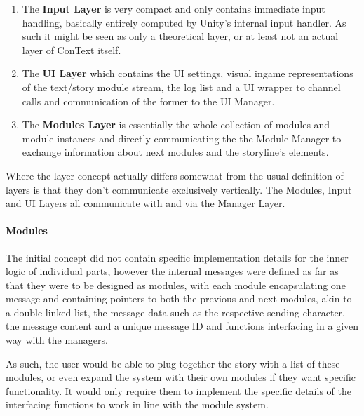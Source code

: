 \begin{enumerate}
\item The \textbf{Input Layer} is very compact and only contains immediate input handling,  basically entirely computed by Unity's internal input handler. As such it might be seen as only a theoretical layer, or at least not an actual layer of ConText itself.
\item The \textbf{UI Layer} which contains the UI settings, visual ingame representations of the text/story module stream, the log list and a UI wrapper to channel calls and communication of the former to the UI Manager.
\item The \textbf{Modules Layer} is essentially the whole collection of modules and module instances and directly communicating the the Module Manager to exchange information about next modules and the storyline's elements.
\end{enumerate}
Where the layer concept actually differs somewhat from the usual definition of layers is that they don't communicate exclusively vertically. The Modules, Input and UI Layers all communicate with and via the Manager Layer.
\paragraph{Modules} The initial concept did not contain specific implementation details for the inner logic of individual parts, however the internal messages were defined as far as that they were to be designed as modules, with each module encapsulating one message and containing pointers to both the previous and next modules, akin to a double-linked list, the message data such as the respective sending character, the message content and a unique message ID and functions interfacing in a given way with the managers. 

As such, the user would be able to plug together the story with a list of these modules, or even expand the system with their own modules if they want specific functionality. It would only require them to implement the specific details of the interfacing functions to work in line with the module system. 

